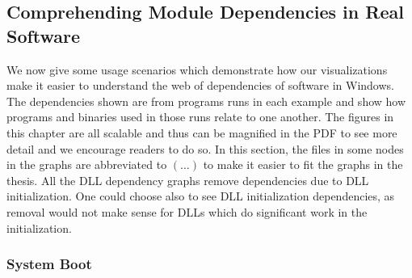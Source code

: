 \subsection{Comprehending Module Dependencies in Real Software}
\label{sec:apply}

We now give some usage scenarios which demonstrate how our visualizations
make it easier to understand the web of dependencies of software in Windows.
The dependencies shown are from programs runs in each
example and show how programs and binaries used in those runs
relate to one another.
The figures in this chapter are all scalable and thus can be magnified
in the PDF to see more detail and we encourage readers to do so.
In this section,
the files in some nodes in the graphs are abbreviated to $(\ldots)$ to make
it easier to fit the graphs in the thesis.
All the DLL dependency graphs remove dependencies due to
DLL initialization.
One could choose also to see DLL initialization dependencies, as removal
would not make sense for DLLs which do significant work in the initialization.

\subsubsection{System Boot}
\label{sec:apply:boot}

